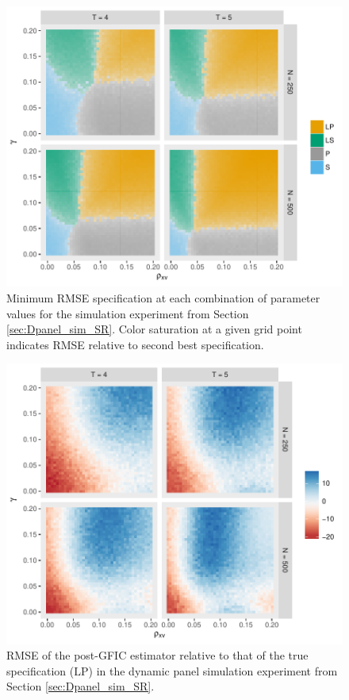 \begin{figure}[htbp]
\centering
\includegraphics[scale = 0.8]{./simulations/DynamicPanel/results/Dpanel_oracle}
\caption{Minimum RMSE specification at each combination of parameter values for the simulation experiment from Section \ref{sec:Dpanel_sim_SR}. Color saturation at a given grid point indicates RMSE relative to second best specification.}
\label{fig:best}
\end{figure}
\begin{figure}
\centering
\includegraphics[scale = 0.8]{./simulations/DynamicPanel/results/Dpanel_GFIC_RMSE_rel_LP}
\caption{RMSE of the post-GFIC estimator relative to that of the true specification ($\text{LP}$) in the dynamic panel simulation experiment from Section \ref{sec:Dpanel_sim_SR}.}
\label{fig:GFIC_rel_LP}
\end{figure}
